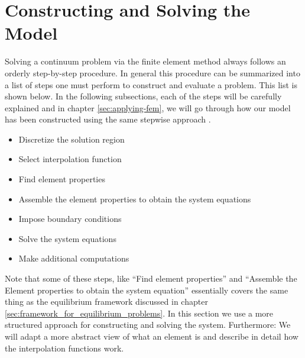 \section{Constructing and Solving the Model}
\label{sec:using-the-FEM}
Solving a continuum problem via the finite element method
always follows an orderly step-by-step procedure. In general this procedure
can be summarized into a list of steps one must perform to construct
and evaluate a problem. This list is shown below.
In the following subsections, each of the steps will be carefully
explained and in chapter \vref{sec:applying-fem}, we will go through
how our model has been constructed using the same stepwise approach
.


\begin{itemize}
\item Discretize the solution region
\item Select interpolation function
\item Find element properties
\item Assemble the element properties to obtain the system equations
\item Impose boundary conditions
\item Solve the system equations
\item Make additional computations
\end{itemize}

Note that some of these steps, like ``Find element properties'' and
``Assemble the Element properties to obtain the system equation''
essentially covers the same thing as the equilibrium framework discussed
in chapter \vref{sec:framework_for_equilibrium_problems}. In this
section we use a more structured approach for constructing and solving
the system. Furthermore: We will adapt a more abstract view of what an
element is and describe in detail how the interpolation functions
work.

